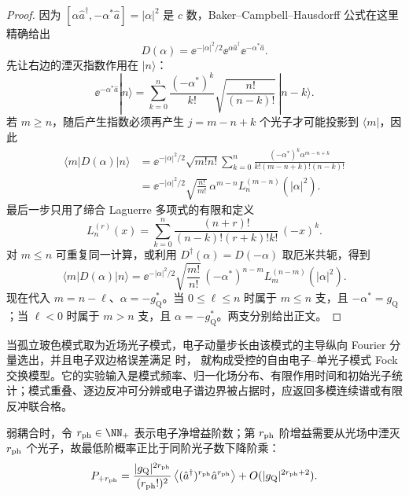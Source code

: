 \begin{proof}
因为 $[\alpha\hat a^\dagger,-\alpha^*\hat a]=|\alpha|^2$ 是 $c$ 数，Baker--Campbell--Hausdorff 公式在这里精确给出
\begin{equation*}
 D(\alpha)
 =\ee^{-|\alpha|^2/2}
 \ee^{\alpha\hat a^\dagger}\ee^{-\alpha^*\hat a}.
\end{equation*}
先让右边的湮灭指数作用在 $|n\rangle$：
\begin{equation*}
 \ee^{-\alpha^*\hat a}|n\rangle
 =\sum_{k=0}^{n}
 \frac{(-\alpha^*)^k}{k!}
 \sqrt{\frac{n!}{(n-k)!}}\,|n-k\rangle .
\end{equation*}
若 $m\ge n$，随后产生指数必须再产生
$j=m-n+k$ 个光子才可能投影到 $\langle m|$，因此
\begin{align*}
 \langle m|D(\alpha)|n\rangle
 &=\ee^{-|\alpha|^2/2}\sqrt{m!n!}
 \sum_{k=0}^{n}
 \frac{(-\alpha^*)^k\alpha^{m-n+k}}
 {k!(m-n+k)!(n-k)!}\\
 &=\ee^{-|\alpha|^2/2}
 \sqrt{\frac{n!}{m!}}\,
 \alpha^{m-n}L_n^{(m-n)}(|\alpha|^2).
\end{align*}
最后一步只用了缔合 Laguerre 多项式的有限和定义
\begin{equation*}
 L_n^{(r)}(x)
 =\sum_{k=0}^{n}
 \frac{(n+r)!}{(n-k)!(r+k)!k!}\,
 (-x)^k.
\end{equation*}
对 $m\le n$ 可重复同一计算，或利用
$D^\dagger(\alpha)=D(-\alpha)$ 取厄米共轭，得到
\begin{equation*}
 \langle m|D(\alpha)|n\rangle
 =\ee^{-|\alpha|^2/2}
 \sqrt{\frac{m!}{n!}}\,
 (-\alpha^*)^{n-m}L_m^{(n-m)}(|\alpha|^2).
\end{equation*}
现在代入 $m=n-\ell$、$\alpha=-g_{\mathrm Q}^*$。当 $0\le\ell\le n$ 时属于 $m\le n$ 支，且 $-\alpha^*=g_{\mathrm Q}$；当 $\ell<0$ 时属于 $m>n$ 支，且 $\alpha=-g_{\mathrm Q}^*$。两支分别给出正文。
\end{proof}


当孤立玻色模式取为近场光子模式，电子动量步长由该模式的主导纵向 Fourier 分量选出，并且电子双边格误差满足 时， 就构成受控的自由电子--单光子模式 Fock 交换模型。它的实验输入是模式频率、归一化场分布、有限作用时间和初始光子统计；模式重叠、逐边反冲可分辨或电子谱边界被占据时，应返回多模连续谱或有限反冲联合格。

弱耦合时，令 $r_{\rm ph}\in\NN_+$ 表示电子净增益阶数；第 $r_{\rm ph}$ 阶增益需要从光场中湮灭 $r_{\rm ph}$ 个光子，故最低阶概率正比于同阶光子数下降阶乘：
\begin{equation}
{
P_{+r_{\rm ph}}
=\frac{|g_{\mathrm Q}|^{2r_{\rm ph}}}{(r_{\rm ph}!)^2}
\left\langle (\hat a^\dagger)^{r_{\rm ph}} \hat a^{r_{\rm ph}}\right\rangle
+O(|g_{\mathrm Q}|^{2r_{\rm ph}+2}).}
\label{eq:qpinem-weak-factorial-moment-dp19}
\end{equation}

